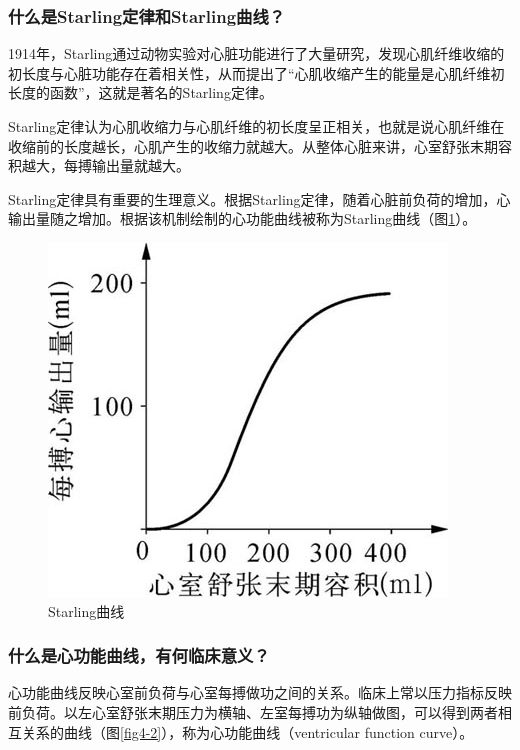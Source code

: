 \subsubsection{什么是Starling定律和Starling曲线？}

1914年，Starling通过动物实验对心脏功能进行了大量研究，发现心肌纤维收缩的初长度与心脏功能存在着相关性，从而提出了“心肌收缩产生的能量是心肌纤维初长度的函数”，这就是著名的Starling定律。

Starling定律认为心肌收缩力与心肌纤维的初长度呈正相关，也就是说心肌纤维在收缩前的长度越长，心肌产生的收缩力就越大。从整体心脏来讲，心室舒张末期容积越大，每搏输出量就越大。

Starling定律具有重要的生理意义。根据Starling定律，随着心脏前负荷的增加，心输出量随之增加。根据该机制绘制的心功能曲线被称为Starling曲线（图\ref{fig4-1}）。

\begin{figure}[!htbp]
 \centering
 \includegraphics{./images/Image00028.jpg}
 \captionsetup{justification=centering}
 \caption{Starling曲线}
 \label{fig4-1}
  \end{figure} 

\subsubsection{什么是心功能曲线，有何临床意义？}

心功能曲线反映心室前负荷与心室每搏做功之间的关系。临床上常以压力指标反映前负荷。以左心室舒张末期压力为横轴、左室每搏功为纵轴做图，可以得到两者相互关系的曲线（图\ref{fig4-2}），称为心功能曲线（ventricular
function curve）。

